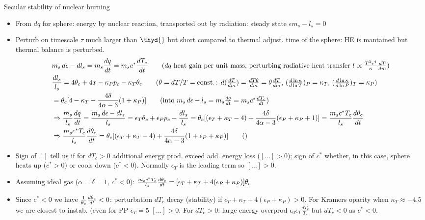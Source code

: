 \begin{frame}{Secular stability of nuclear burning}
    \begin{itemize}
    \item From $dq$ for sphere: energy by nuclear reaction, transported out by radiation: steady state $\epsilon m_s-l_s=0$
    \item Perturb on timescale $\tau$ much larger than $\thyd{}$ but short compared to thermal adjust. time of the sphere: HE is mantained but thermal balance is perturbed.
        \begin{align*}
            &m_s\,d\epsilon-dl_s=m_s\TDy{t}{q}=m_sc^*\TDy{t}{T_c}\tag{$dq$ heat gain per unit mass, perturbing radiative heat transfer $l\propto \frac{T^3r^4}{\kappa}\TDy{m}{T}$}\\
        &\frac{dl_s}{l_s}=4\theta_c+4x-\kappa_Pp_c-\kappa_T\theta_c\tag{$\theta=dT/T=\const{}$: $d(\TDy{m}{T})=\TDy{m}{T\theta}=\theta\TDy{m}{T}$, $(\TDly{T}{\kappa})_P=\kappa_T$, $(\TDly{P}{\kappa})_T=\kappa_P$}\\
        &=\theta_c[4-\kappa_T-\frac{4\delta}{4\alpha-3}(1+\kappa_P)]\tag{into $m_s\,d\epsilon-l_s=m_s\TDy{t}{q}=m_sc^*\TDy{t}{T_c}$}\\
        &\Rightarrow \frac{m_s}{l_s}\TDy{t}{q}=\frac{m_s\,d\epsilon-dl_s}{l_s}=\epsilon_T\theta_c+\epsilon_Pp_c-\frac{dl_s}{l_s}=\theta_c[(\epsilon_T+\kappa_T-4)+\frac{4\delta}{4\alpha-3}(\epsilon_P+\kappa_P+1)]=\frac{m_sc^*T_c}{l_s}\TDy{t}{\theta_c}\\
        &\Rightarrow \frac{m_sc^*T_c}{l_s}\TDy{t}{\theta_c}=\theta_c[(\epsilon_T+\kappa_T-4)+\frac{4\delta}{4\alpha-3}(1+\epsilon_P+\kappa_P)]\tag{}
        \end{align*}
    \item Sign of $[]$ tell us if for $dT_c>0$ additional energy prod. exceed add. energy loss ($[\ldots]>0$); sign of $c^*$ whether, in this case, sphere heats up ($c^*>0$) or cools down ($c^*<0$). Normally $\epsilon_T$ is the leading term so $[\ldots]>0$.
    \item Assuming ideal gas ($\alpha=\delta=1$, $c^*<0$): $\frac{m_sc^*T_c}{l_s}\TDy{t}{\theta_c}=[\epsilon_T+\kappa_T+4(\epsilon_P+\kappa_P)]\theta_c$
    \item Since $c^*<0$ we have $\frac{1}{\theta_c}\TDy{t}{\theta_c}<0$: perturbation $dT_c$ decay (stability) if $\epsilon_T+\kappa_T+4(\epsilon_P+\kappa_P)>0$. For Kramers opacity when $\kappa_T\approx-4.5$ we are closest to instab. (even for PP $\epsilon_T=5$ $[\ldots]>0$. For $dT_c>0$: large energy overprod $\epsilon_0\epsilon_T \frac{dT_c}{T_c}$ but $dT_c<0$ as $c^*<0$.

\end{itemize}
\end{frame}
